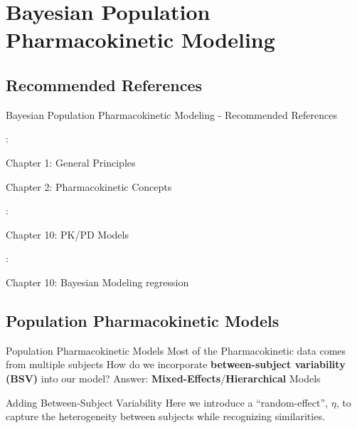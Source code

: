 \section{Bayesian Population Pharmacokinetic Modeling}

\subsection{Recommended References}
\begin{frame}{Bayesian Population Pharmacokinetic Modeling - Recommended References}
    \begin{vfilleditems}
        \item \textcite{Gabrielsson2006PKPDbook}:
        \begin{vfilleditems}
            \item Chapter 1: General Principles
            \item Chapter 2: Pharmacokinetic Concepts
        \end{vfilleditems}
        \item \textcite{Owen2014PKPDbook}:
        \begin{vfilleditems}
            \item Chapter 10: PK/PD Models
        \end{vfilleditems}
        \item \textcite{Bonate2011PKPDbook}:
        \begin{vfilleditems}
            \item Chapter 10: Bayesian Modeling regression
        \end{vfilleditems}
        \item \textcite{margossian2022torsten}
    \end{vfilleditems}
\end{frame}

\subsection{Population Pharmacokinetic Models}
\begin{frame}{Population Pharmacokinetic Models}
    Most of the Pharmacokinetic data comes from multiple subjects
    \vfill
    How do we incorporate \textbf{between-subject variability (BSV)} into our model?
    \vfill
    Answer: \textbf{Mixed-Effects}/\textbf{Hierarchical} Models
\end{frame}

\begin{frame}{Adding Between-Subject Variability}
    Here we introduce a ``random-effect'', $\eta$,
    to capture the heterogeneity between subjects
    while recognizing similarities.
\end{frame}

